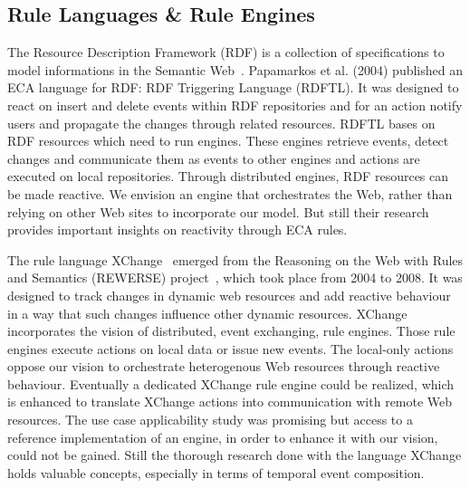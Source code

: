 \subsection{Rule Languages \& Rule Engines}
The Resource Description Framework (\textrm{RDF}) is a collection of specifications to model informations in the \textrm{Semantic Web}~\cite{berners2001semantic}.
Papamarkos et al. (2004) published an \textrm{ECA} language for \textrm{RDF}: \textrm{RDF Triggering Language} (\textrm{RDFTL}).
It was designed to react on insert and delete events within \textrm{RDF} repositories and for an action notify users and propagate the changes through related resources.%
\textrm{RDFTL} bases on \textrm{RDF} resources which need to run engines.
These engines retrieve events, detect changes and communicate them as events to other engines and actions are executed on local repositories.
Through distributed engines, \textrm{RDF} resources can be made reactive.
We envision an engine that orchestrates the Web, rather than relying on other Web sites to incorporate our model.
But still their research provides important insights on reactivity through \textrm{ECA} rules.

The rule language \textrm{XChange}~\cite{2005-Patranjan-TLE.pdf} emerged from the \textrm{Reasoning on the Web with Rules and Semantics} (\textrm{REWERSE}) project~\cite{wwwRewerse}, which took place from 2004 to 2008. 
It was designed to track changes in dynamic web resources and add reactive behaviour in a way that such changes influence other dynamic resources.
\textrm{XChange} incorporates the vision of distributed, event exchanging, rule engines.
Those rule engines execute actions on local data or issue new events.
The local-only actions oppose our vision to orchestrate heterogenous Web resources through reactive behaviour.
Eventually a dedicated \textrm{XChange} rule engine could be realized, which is enhanced to translate \textrm{XChange} actions into communication with remote Web resources.
The use case applicability study was promising but access to a reference implementation of an engine, in order to enhance it with our vision, could not be gained. %
Still the thorough research done with the language \textrm{XChange} holds valuable concepts, especially in terms of temporal event composition.

